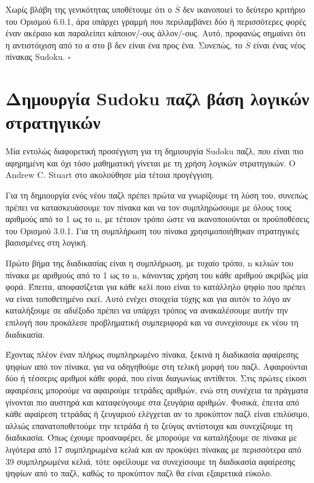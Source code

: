 \documentclass[oneside,12pt]{book}
\theoremstyle{definition}
\begin{document}
Χωρίς βλάβη της γενικότητας υποθέτουμε ότι ο \(\overline{S}\) δεν ικανοποιεί το δεύτερο κριτήριο του Ορισμού 6.0.1, άρα υπάρχει γραμμή που περιλαμβάνει δύο ή περισσότερες φορές έναν ακέραιο και παραλείπει κάποιον/-ους άλλον/-ους. Αυτό, προφανώς σημαίνει ότι η αντιστόιχιση από το α στο β δεν είναι ένα προς ένα. Συνεπώς, το \(\overline{S}\) είναι ένας νέος πίνακας Sudoku. \(\square\)

\section{Δημουργία Sudoku παζλ βάση λογικών στρατηγικών}

Μία εντολώς διαφορετική προσέγγιση για τη δημιουργία Sudoku παζλ, που είναι πιο αφηρημένη και όχι τόσο μαθηματική γίνεται με τη χρήση λογικών στρατηγικών. Ο Andrew C. Stuart στο \cite{9} ακολούθησε μία τέτοια προγέγγιση. \par

Για τη δημιουργία ενός νέου παζλ πρέπει πρώτα να γνωρίζουμε τη λύση του, συνεπώς πρέπει να κατασκευάσουμε τον πίνακα και να τον συμπληρώσουμε με όλους τους αριθμούς από το 1 ως το n, με τέτοιον τρόπο ώστε να ικανοποιούνται οι προϋποθέσεις του Ορισμού 3.0.1. Για τη συμπλήρωση του πίνακα χρησιμοποιήθηκαν στρατηγικές βασισμένες στη λογική. \par

Πρώτο βήμα της διαδικασίας είναι η συμπλήρωση, με τυχαίο τρόπο, n κελιών του πίνακα με αριθμούς από το 1 ως το n, κάνοντας χρήση του κάθε αριθμού ακριβώς μία φορά. Έπειτα, αποφασίζεται για κάθε κελί ποιο είναι το κατάλληλο ψηφίο που πρέπει να είναι τοποθετημένο εκεί. Αυτό ενέχει στοιχεία τύχης και για αυτόν το λόγο αν καταλήξουμε σε αδιέξοδο πρέπει να υπάρχει τρόπος να ανακαλέσουμε αυτήν την επιλογή που προκάλεσε προβληματική συμπεριφορά και να συνεχίσουμε εκ νέου τη διαδικασία. \par

Έχοντας πλέον έναν πλήρως συμπληρωμένο πίνακα, ξεκινά η διαδικασία αφαίρεσης ψηφίων από τον πίνακα, για να οδηγηθούμε στη τελική μορφή του παζλ. Αφαιρούνται δύο ή τέσσερις αριθμοί κάθε φορά, που είναι διαγωνίως αντίθετοι. Στις πρώτες είκοσι αφαιρέσεις μπορούμε να αφαιρούμε τετράδες αριθμών, ενώ στη συνέχεια τα πράγματα γίνονται πιο αυστηρά και καταφεύγουμε στα ζευγάρια αριθμών. Φυσικά, έπειτα από κάθε αφαίρεση τετράδας ή ζευγαριού ελέγχεται αν το προκύπτον παζλ είναι επιλύσιμο, αλλιώς επανατοποθετούμε την τετράδα ή το ζεύγος αντίστοιχα και συνεχίζουμε τη διαδικασία. Όπως έχουμε προαναφέρει, δε μπορούμε να καταλήξουμε σε πίνακα με λιγότερα από 17 συμπληρωμένα κελιά και αν προκύψει πίνακας με περισσότερα από 39 συμπληρωμένα κελιά, τότε οφείλουμε να συνεχίσουμε τη διαδικασία αφαίρεσης ψηφίων από το παζλ, καθώς το προκύπτον παζλ θα είναι εξαιρετικά εύκολο. \par
\end{document}
